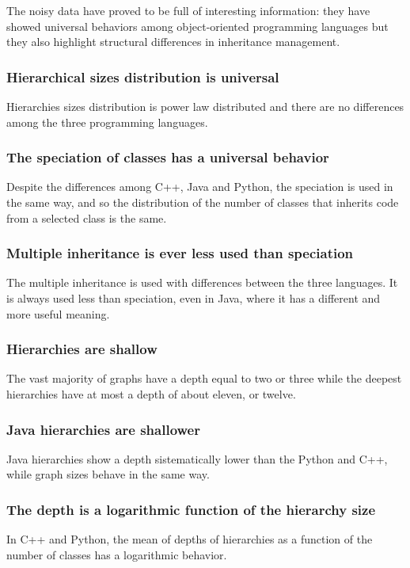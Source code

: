 The noisy data have proved to be full of interesting information: they have showed universal behaviors among object-oriented programming languages but they also highlight structural differences in inheritance management.

%
\subsubsection{Hierarchical sizes distribution is universal}
Hierarchies sizes distribution is power law distributed and there are no differences among the three programming languages.

\subsubsection{The speciation of classes has a universal behavior}
Despite the differences among C++, Java and Python, the speciation is used in the same way, and so the distribution of the number of classes that inherits code from a selected class is the same.

\subsubsection{Multiple inheritance is ever less used than speciation}
The multiple inheritance is used with differences between the three languages. It is always used less than speciation, even in Java, where it has a different and more useful meaning.

\subsubsection{Hierarchies are shallow}
The vast majority of graphs have a depth equal to two or three while the deepest hierarchies have at most a depth of about eleven, or twelve.

\subsubsection{Java hierarchies are shallower}
Java hierarchies show a depth sistematically lower than the Python and C++, while graph sizes behave in the same way.

\subsubsection{The depth is a logarithmic function of the hierarchy size}
In C++ and Python, the mean of depths of hierarchies as a function of the number of classes has a logarithmic behavior.

